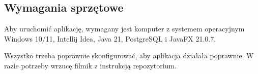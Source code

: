 \subsection{Wymagania sprzętowe}
Aby uruchomić aplikację, wymagany jest komputer z systemem operacyjnym Windows 10/11, Intellij Idea, Java 21, PostgreSQL i JavaFX 21.0.7.

Wszystko trzeba poprawnie skonfigurować, aby aplikacja działała poprawnie. W razie potrzeby wrzucę filmik z instrukcją repozytorium.

